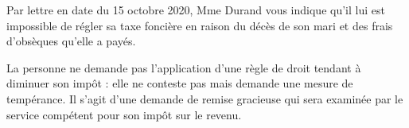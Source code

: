 \documentclass[answers, 12pt]{exam}
\begin{document}
\begin{questions}
		
		\question Par lettre en date du 15 octobre 2020, Mme Durand vous indique qu'il lui est impossible de régler sa taxe foncière en raison du décès de son mari et des frais d'obsèques qu'elle a payés.
		\begin{solution}
			La personne ne demande pas l'application d'une règle de droit tendant à diminuer son impôt : elle ne conteste pas mais demande une mesure de tempérance. Il s'agit d'une demande de remise gracieuse qui sera examinée par le service compétent pour son impôt sur le revenu.
		\end{solution}
		

\end{questions}
\end{document}
